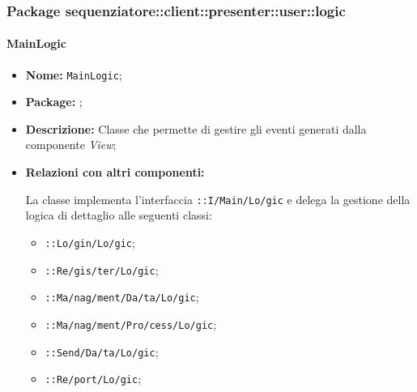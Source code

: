\subsubsection{Package sequenziatore::client::presenter::user::logic}

\paragraph{MainLogic}
\begin{flushleft}
\begin{itemize}
\item \textbf{Nome:} \texttt{MainLogic};
\item \textbf{Package:} \texttt{\logicUser{}};
\item \textbf{Descrizione:} Classe che permette di gestire gli eventi generati dalla componente \textit{View};
\item \textbf{Relazioni con altri componenti:}
\begin{sloppypar}
La classe implementa l'interfaccia \texttt{\iLogicUser{}::I\fshyp{}Main\fshyp{}Lo\fshyp{}gic} e delega la gestione della logica di dettaglio alle seguenti classi:
\end{sloppypar}
\begin{itemize}
\item \texttt{\logicUser{}::Lo\fshyp{}gin\fshyp{}Lo\fshyp{}gic};
\item \texttt{\logicUser{}::Re\fshyp{}gis\fshyp{}ter\fshyp{}Lo\fshyp{}gic};
\item \texttt{\logicUser{}::Ma\fshyp{}nag\fshyp{}ment\fshyp{}Da\fshyp{}ta\fshyp{}Lo\fshyp{}gic};
\item \texttt{\logicUser{}::Ma\fshyp{}nag\fshyp{}ment\fshyp{}Pro\fshyp{}cess\fshyp{}Lo\fshyp{}gic};
\item \texttt{\logicUser{}::Send\fshyp{}Da\fshyp{}ta\fshyp{}Lo\fshyp{}gic};
\item \texttt{\logicUser{}::Re\fshyp{}port\fshyp{}Lo\fshyp{}gic};
\end{itemize}
\end{itemize}
\end{flushleft}

